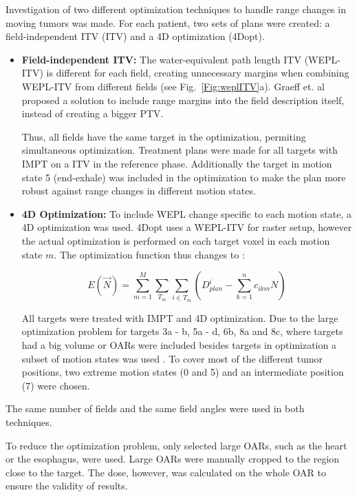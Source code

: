 Investigation of two different optimization techniques to handle range changes in moving tumors was made. For each patient, two sets of plans were created: a field-independent ITV (ITV) and a 4D optimization (4Dopt). 

\begin{itemize}
\item \textbf{Field-independent ITV:} The water-equivalent path length ITV (WEPL-ITV) is different for each field, creating unnecessary margins when combining 
WEPL-ITV from different fields (see Fig.~\ref{Fig:weplITV}a). 
Graeff et. al \cite{Graeff2012} proposed a solution to include range margins into the field description itself, instead of creating a bigger PTV. 

Thus, all fields have the same target in the optimization, permiting simultaneous optimization. 
Treatment plans were made for all targets with IMPT on a ITV in the reference phase. Additionally the target in motion state 5 (end-exhale) was included in the optimization
to make the plan more robust against range changes in different motion states.

\item \textbf{4D Optimization:} To include WEPL change specific to each motion state, a 4D optimization was used. 4Dopt uses a WEPL-ITV for raster setup, 
however the actual optimization is performed on each target voxel in each motion state $m$. The optimization function thus changes to \cite{Graeff2012}:

\begin{equation}
E(\vec{N}) = \sum_{m=1}^{M}\sum_{T_m} \sum_{i\in T_m} \left( D_{plan}^{i} -\sum_{k=1}^n c_{ikm}N\right)
\end{equation}

All targets were treated with IMPT and 4D optimization. Due to the large optimization problem for targets 3a - b, 5a - d, 6b, 8a and 8c, where targets had a big volume or 
OARs were included besides targets in optimization a subset of motion states was used \cite{Graeff2012}. 
To cover most of the different tumor positions, two extreme motion states (0 and 5) and an intermediate position (7) were chosen.

\end{itemize}

The same number of fields and the same field angles were used in both techniques.

To reduce the optimization problem, only selected large OARs, such as the heart or the esophagus, were used. Large OARs were manually cropped to the region close to the 
target. The dose, however, was calculated on the whole OAR to ensure the validity of results.


